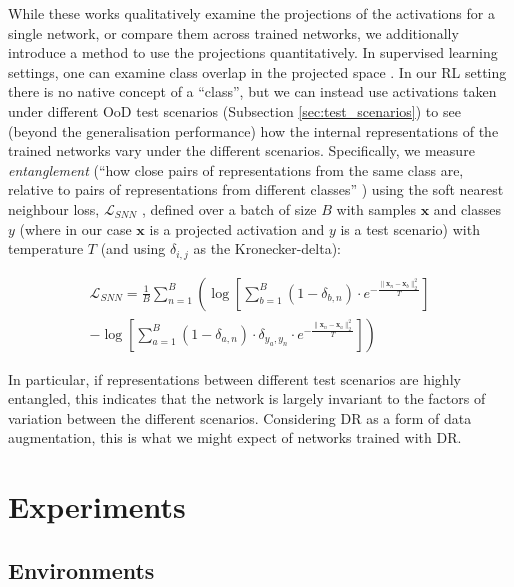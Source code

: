 While these works qualitatively examine the projections of the
activations for a single network, or compare them across trained
networks, we additionally introduce a method to use the projections
quantitatively. In supervised learning settings, one can examine class
overlap in the projected space \cite{rauber2017visualizing}. In our RL
setting there is no native concept of a ``class'', but we can instead
use activations taken under different OoD test scenarios (Subsection
\ref{sec:test_scenarios}) to see (beyond the generalisation performance)
how the internal representations of the trained networks vary under the
different scenarios. Specifically, we measure \emph{entanglement} (``how
close pairs of representations from the same class are, relative to
pairs of representations from different classes''
\cite{frosst2019analyzing}) using the soft nearest neighbour loss,
\(\mathcal{L}_{SNN}\) \cite{salakhutdinov2007learning}, defined over a
batch of size \(B\) with samples \(\mathbf{x}\) and classes \(y\) (where
in our case \(\mathbf{x}\) is a projected activation and \(y\) is a test
scenario) with temperature \(T\) (and using \(\delta_{i,j}\) as the
Kronecker-delta):

\begin{eqnarray}
\mathcal{L}_{SNN} = \frac{1}{B} \sum_{n=1}^B \left ( \log \left [ \sum_{b=1}^B (1-\delta_{b,n}) \cdot e^{-\frac{\lVert \mathbf{x}_n - \mathbf{x}_b \rVert_2^2}{T}} \right ] \right . \nonumber \\
\left . -\log \left [\sum_{a=1}^B (1-\delta_{a,n}) \cdot \delta_{y_a,y_n} \cdot e^{-\frac{\lVert \mathbf{x}_n - \mathbf{x}_a \rVert_2^2}{T}} \right ] \right )
\end{eqnarray}

In particular, if representations between different test scenarios are
highly entangled, this indicates that the network is largely invariant
to the factors of variation between the different scenarios. Considering
DR as a form of data augmentation, this is what we might expect of
networks trained with DR.

\hypertarget{experiments}{%
\section{Experiments}\label{experiments}}

\label{sec:experiments}

\hypertarget{environments}{%
\subsection{Environments}\label{environments}}


